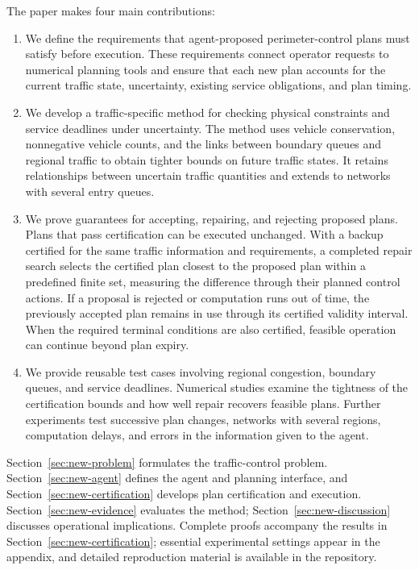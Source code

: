 \documentclass[preprint,12pt]{elsarticle}
\begin{document}
The paper makes four main contributions:
\begin{enumerate}
\item We define the requirements that agent-proposed perimeter-control plans
must satisfy before execution. These requirements connect operator requests
to numerical planning tools and ensure that each new plan accounts for the
current traffic state, uncertainty, existing service obligations, and plan
timing.

\item We develop a traffic-specific method for checking physical constraints
and service deadlines under uncertainty. The method uses vehicle
conservation, nonnegative vehicle counts, and the links between boundary
queues and regional traffic to obtain tighter bounds on future traffic
states. It retains relationships between uncertain traffic quantities and
extends to networks with several entry queues.

\item We prove guarantees for accepting, repairing, and rejecting proposed
plans. Plans that pass certification can be executed unchanged. With a
backup certified for the same traffic information and requirements, a
completed repair search selects the certified plan closest to the proposed
plan within a predefined finite set, measuring the difference through their
planned control actions. If a proposal is rejected or computation runs out
of time, the previously accepted plan remains in use through its certified
validity interval. When the required terminal conditions are also certified,
feasible operation can continue beyond plan expiry.

\item We provide reusable test cases involving regional congestion, boundary
queues, and service deadlines. Numerical studies examine the tightness of
the certification bounds and how well repair recovers feasible plans.
Further experiments test successive plan changes, networks with several
regions, computation delays, and errors in the information given to the
agent.
\end{enumerate}

Section~\ref{sec:new-problem} formulates the traffic-control problem. Section~\ref{sec:new-agent} defines the agent and planning interface, and Section~\ref{sec:new-certification} develops plan certification and execution. Section~\ref{sec:new-evidence} evaluates the method; Section~\ref{sec:new-discussion} discusses operational implications. Complete proofs accompany the results in Section~\ref{sec:new-certification}; essential experimental settings appear in the appendix, and detailed reproduction material is available in the repository.
\end{document}
